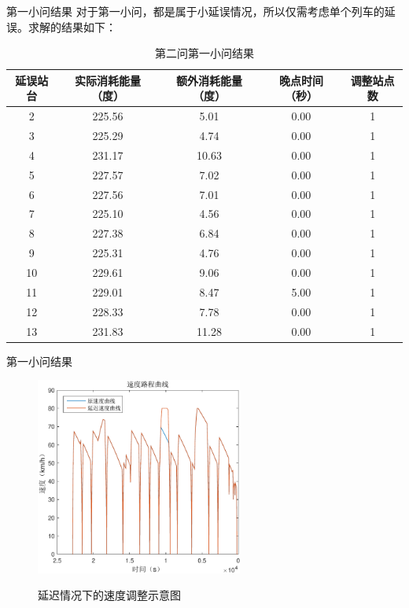 \documentclass{beamer}
\begin{document}
\begin{frame}{第一小问结果}
对于第一小问，都是属于小延误情况，所以仅需考虑单个列车的延误。求解的结果如下：
\begin{table} \tiny
  \centering
  \caption{第二问第一小问结果}
  \begin{tabular}{ccccc}
  \hline
  延误站台 & 实际消耗能量（度） & 额外消耗能量（度） & 晚点时间（秒） & 调整站点数 \\
  \hline
  2 & 225.56 & 5.01 & 0.00 & 1 \\
  3 & 225.29 & 4.74 & 0.00 & 1 \\
  4 & 231.17 & 10.63 & 0.00 & 1 \\
  5 & 227.57 & 7.02 & 0.00 & 1 \\
  6 & 227.56 & 7.01 & 0.00 & 1 \\
  7 & 225.10 & 4.56 & 0.00 & 1 \\
  8 & 227.38 & 6.84 & 0.00 & 1 \\
  9 & 225.31 & 4.76 & 0.00 & 1 \\
  10 & 229.61 & 9.06 & 0.00 & 1 \\
  11 & 229.01 & 8.47 & 5.00 & 1 \\
  12 & 228.33 & 7.78 & 0.00 & 1 \\
  13 & 231.83 & 11.28 & 0.00 & 1 \\
  \hline
\end{tabular}
  \label{p2sub1}
\end{table}
\end{frame}

\begin{frame}{第一小问结果}
\begin{figure}
  \centering
  \includegraphics[width=6.8cm]{fig/fig15/fig15.pdf}\\
  \caption{延迟情况下的速度调整示意图}
\end{figure}

\end{frame}
\end{document}
